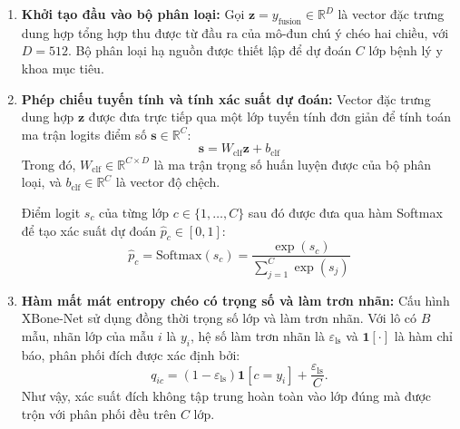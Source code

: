 \begin{enumerate}
    \item \textbf{Khởi tạo đầu vào bộ phân loại:}
    Gọi $\mathbf{z} = y_{\text{fusion}} \in \mathbb{R}^D$ là vector đặc trưng dung hợp tổng hợp thu được từ đầu ra của mô-đun chú ý chéo hai chiều, với $D=512$. Bộ phân loại hạ nguồn được thiết lập để dự đoán $C$ lớp bệnh lý y khoa mục tiêu.

    \item \textbf{Phép chiếu tuyến tính và tính xác suất dự đoán:}
    Vector đặc trưng dung hợp $\mathbf{z}$ được đưa trực tiếp qua một lớp tuyến tính đơn giản để tính toán ma trận logits điểm số $\mathbf{s} \in \mathbb{R}^{C}$:
    \begin{equation}
    \mathbf{s} = W_{\text{clf}} \mathbf{z} + b_{\text{clf}}
    \end{equation}
    Trong đó, $W_{\text{clf}} \in \mathbb{R}^{C \times D}$ là ma trận trọng số huấn luyện được của bộ phân loại, và $b_{\text{clf}} \in \mathbb{R}^{C}$ là vector độ chệch.
    
    Điểm logit $s_c$ của từng lớp $c \in \{1,\dots,C\}$ sau đó được đưa qua hàm Softmax để tạo xác suất dự đoán $\hat{p}_c \in [0,1]$:
    \begin{equation}
    \hat{p}_c = \text{Softmax}(s_c) = \frac{\exp(s_c)}{\sum_{j=1}^{C} \exp(s_j)}
    \end{equation}

    \item \textbf{Hàm mất mát entropy chéo có trọng số và làm trơn nhãn:}
    Cấu hình XBone-Net sử dụng đồng thời trọng số lớp và làm trơn nhãn. Với lô có $B$ mẫu, nhãn lớp của mẫu $i$ là $y_i$, hệ số làm trơn nhãn là $\varepsilon_{\mathrm{ls}}$ và $\mathbf{1}[\cdot]$ là hàm chỉ báo, phân phối đích được xác định bởi:
    \begin{equation}
    q_{ic}
    =
    \left(1-\varepsilon_{\mathrm{ls}}\right)\mathbf{1}[c=y_i]
    +\frac{\varepsilon_{\mathrm{ls}}}{C}.
    \label{eq:ch3_smoothed_target}
    \end{equation}
    Như vậy, xác suất đích không tập trung hoàn toàn vào lớp đúng mà được trộn với phân phối đều trên $C$ lớp.

    \pagebreak
    

\end{enumerate}
